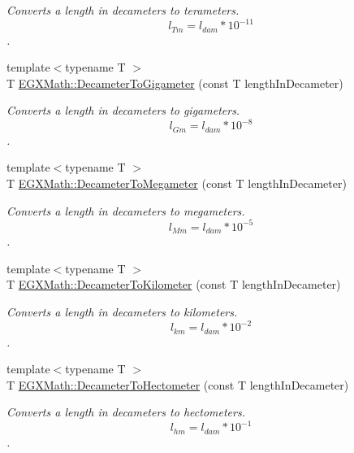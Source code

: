 \begin{DoxyCompactItemize}
\begin{DoxyCompactList}\small\item\em Converts a length in decameters to terameters. \[ l_{Tm}=l_{dam} * 10^{-11} \]. \end{DoxyCompactList}\item 
{\footnotesize template$<$typename T $>$ }\\T \mbox{\hyperlink{group___e_g_x_math-_conversions-_length_conversions-_s_i-_decameter-_s_i_gaa889b61d8f9874010be977ce71b4dfaf}{E\+G\+X\+Math\+::\+Decameter\+To\+Gigameter}} (const T length\+In\+Decameter)
\begin{DoxyCompactList}\small\item\em Converts a length in decameters to gigameters. \[ l_{Gm}=l_{dam} * 10^{-8} \]. \end{DoxyCompactList}\item 
{\footnotesize template$<$typename T $>$ }\\T \mbox{\hyperlink{group___e_g_x_math-_conversions-_length_conversions-_s_i-_decameter-_s_i_ga84e31290bf0886972b10479e4fd37fb4}{E\+G\+X\+Math\+::\+Decameter\+To\+Megameter}} (const T length\+In\+Decameter)
\begin{DoxyCompactList}\small\item\em Converts a length in decameters to megameters. \[ l_{Mm}=l_{dam} * 10^{-5} \]. \end{DoxyCompactList}\item 
{\footnotesize template$<$typename T $>$ }\\T \mbox{\hyperlink{group___e_g_x_math-_conversions-_length_conversions-_s_i-_decameter-_s_i_gaecb6cb385676cad8430d23e529e4a59e}{E\+G\+X\+Math\+::\+Decameter\+To\+Kilometer}} (const T length\+In\+Decameter)
\begin{DoxyCompactList}\small\item\em Converts a length in decameters to kilometers. \[ l_{km}=l_{dam} * 10^{-2} \]. \end{DoxyCompactList}\item 
{\footnotesize template$<$typename T $>$ }\\T \mbox{\hyperlink{group___e_g_x_math-_conversions-_length_conversions-_s_i-_decameter-_s_i_ga24daff76ac2de77bf8f55d134aa450d8}{E\+G\+X\+Math\+::\+Decameter\+To\+Hectometer}} (const T length\+In\+Decameter)
\begin{DoxyCompactList}\small\item\em Converts a length in decameters to hectometers. \[ l_{hm}=l_{dam} * 10^{-1} \]. \end{DoxyCompactList}\item 

\end{DoxyCompactItemize}
